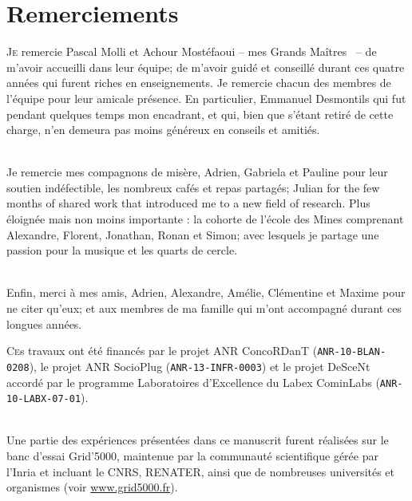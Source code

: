 
\chapter*{Remerciements}

\lettrine{J}e remercie Pascal Molli et Achour Mostéfaoui -- mes \og Grands
Maîtres \fg~-- de m'avoir accueilli dans leur équipe; de m'avoir guidé et
conseillé durant ces quatre années qui furent riches en enseignements. Je
remercie chacun des membres de l'équipe pour leur amicale présence. En
particulier, Emmanuel Desmontils qui fut pendant quelques temps mon encadrant,
et qui, bien que s'étant retiré de cette charge, n'en demeura pas moins généreux
en conseils et amitiés.

\ \\

Je remercie mes compagnons de misère, Adrien, Gabriela et Pauline pour leur
soutien indéfectible, les nombreux cafés et repas partagés; Julian for the few
months of shared work that introduced me to a new field of research. Plus
éloignée mais non moins importante : la cohorte de l'école des Mines comprenant
Alexandre, Florent, Jonathan, Ronan et Simon; avec lesquels je partage une
passion pour la musique et les quarts de cercle.

\ \\

Enfin, merci à mes amis, Adrien, Alexandre, Amélie, Clémentine et Maxime pour ne
citer qu'eux; et aux membres de ma famille qui m'ont accompagné durant ces
longues années.

\vfill

\lettrine{C}es travaux ont été %
financés par le projet ANR ConcoRDanT (\texttt{ANR-10-BLAN-0208}), le projet ANR
SocioPlug (\texttt{ANR-13-INFR-0003}) et le projet DeSceNt accordé par le
programme \og Laboratoires d'Excellence \fg du Labex CominLabs
(\texttt{ANR-10-LABX-07-01}).

\ \\

Une partie des expériences présentées dans ce manuscrit furent réalisées sur le
banc d'essai Grid'5000, maintenue par la communauté scientifique gérée par
l'Inria et incluant le CNRS, RENATER, ainsi que de nombreuses universités et
organismes (voir \url{www.grid5000.fr}).




